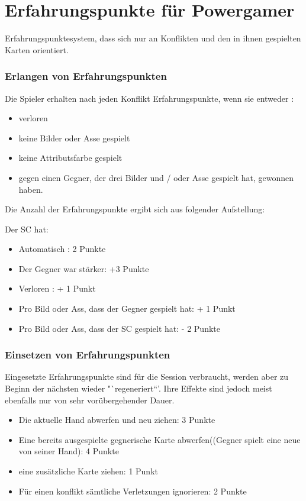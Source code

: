 \section{Erfahrungspunkte für Powergamer}
\label{sect:ErfahrungspunktefuerPowergamer}
Erfahrungspunktesystem, dass sich nur an Konflikten und den in ihnen gespielten Karten orientiert.
\subsubsection{Erlangen von Erfahrungspunkten}

Die Spieler erhalten nach jeden Konflikt Erfahrungspunkte, wenn sie entweder :
\begin{itemize}
\item verloren
\item keine Bilder oder Asse gespielt
\item keine Attributsfarbe gespielt
\item gegen einen Gegner, der drei Bilder und / oder Asse gespielt hat, gewonnen haben.
\end{itemize}

Die Anzahl der Erfahrungspunkte ergibt sich aus folgender Aufstellung:

Der SC hat:
\begin{itemize}
\item Automatisch : 2 Punkte
\item Der Gegner war stärker: +3 Punkte
\item Verloren : + 1 Punkt
\item Pro Bild oder Ass, dass der Gegner gespielt hat: + 1 Punkt
\item Pro Bild oder Ass, dass der SC gespielt hat: - 2 Punkte
\end{itemize}

 

\subsubsection{Einsetzen von Erfahrungspunkten}

Eingesetzte Erfahrungspunkte sind für die Session verbraucht, werden aber zu Beginn der nächsten wieder "`regeneriert“'. Ihre Effekte sind jedoch meist ebenfalls nur von sehr vorübergehender Dauer.
\begin{itemize}
\item Die aktuelle Hand abwerfen und neu ziehen: 3 Punkte
\item Eine bereits ausgespielte gegnerische Karte abwerfen((Gegner spielt eine neue von seiner Hand): 4 Punkte
\item eine zusätzliche Karte ziehen: 1 Punkt
\item Für einen konflikt sämtliche Verletzungen ignorieren: 2 Punkte
\end{itemize}

